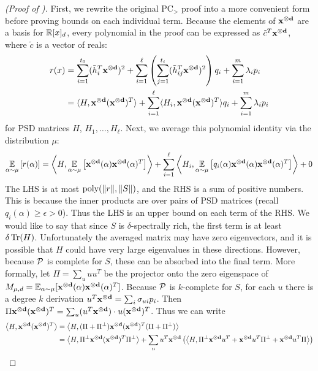 \begin{proof}[(Proof of )]
First, we rewrite the original PC$_>$ proof into a more convenient form before proving bounds on each individual term. Because the elements of $\mathbf{x^{\otimes d}}$ are a basis for $\mathbb R[x]_d$, every polynomial in the proof can be expressed as $\tilde{c}^T\mathbf{x^{\otimes d}}$, where $\tilde{c}$ is a vector of reals:
\begin{align*} r(x) &= \sum_{i=1}^{t_0} (\tilde{h}_i^T\mathbf{x^{\otimes d}})^2 + \sum_{i=1}^\ell \left(\sum_{j=1}^{t_i} (\tilde{h}_{ij}^T\mathbf{x^{\otimes d}})^2\right)q_i + \sum_{i=1}^m \lambda_i p_i \\
&= \langle H, \mathbf{x^{\otimes d}}(\mathbf{x^{\otimes d}})^T\rangle + \sum_{i=1}^\ell \langle H_i, \mathbf{x^{\otimes d}}(\mathbf{x^{\otimes d}})^T\rangle q_i + \sum_{i=1}^m \lambda_i p_i
\end{align*}
for PSD matrices $H$, $H_1,\dots,H_\ell$. Next, we average this polynomial identity via the distribution $\mu$:
\begin{align*}
\operatorname*{\mathbb{E}}_{\alpha \sim \mu}\left[r(\alpha)\right] &= \left\langle H, \operatorname*{\mathbb{E}}_{\alpha \sim \mu}\left[\mathbf{x^{\otimes d}}(\alpha)\mathbf{x^{\otimes d}}(\alpha)^T\right]\right\rangle + \sum_{i=1}^\ell \left\langle H_i, \operatorname*{\mathbb{E}}_{\alpha \sim \mu}\left[q_i(\alpha)\mathbf{x^{\otimes d}}(\alpha)\mathbf{x^{\otimes d}}(\alpha)^T\right]\right\rangle + 0 \\
\end{align*}
The LHS is at most $\operatorname{poly}(\|r\|, \|S\|)$, and the RHS is a sum of positive numbers. This is because the inner products are over pairs of PSD matrices (recall $q_i(\alpha) \geq \epsilon > 0$). Thus the LHS is an upper bound on each term of the RHS. 
%
We would like to say that since $S$ is $\delta$-spectrally rich, the first term is at least $\delta \operatorname{Tr}(H)$. 
%
Unfortunately the averaged matrix may have zero eigenvectors, and it is possible that $H$ could have very large eigenvalues in these directions. 
%
However, because $\mathcal P$ is complete for $S$, these can be absorbed into the final term. More formally, let $\Pi = \sum_u uu^T$ be the projector onto the zero eigenspace of $M_{\mu,d} = \operatorname*{\mathbb{E}}_{\alpha \sim \mu}[\mathbf{x^{\otimes d}}(\alpha)\mathbf{x^{\otimes d}}(\alpha)^T]$. Because $\mathcal P$ is $k$-complete for $S$, for each $u$ there is a degree $k$ derivation $u^T\mathbf{x^{\otimes d}} = \sum_i \sigma_{ui} p_i$. Then $\Pi \mathbf{x^{\otimes d}}(\mathbf{x^{\otimes d}})^T = \sum_u (u^T\mathbf{x^{\otimes d}}) \cdot u(\mathbf{x^{\otimes d}})^T$. Thus we can write
\begin{align*}
\Iprod{H, \mbasis{d}(\mbasis{d})^T} &= \Iprod{H, (\Pi + \Pi^\perp)\mbasis{d}(\mbasis{d})^T(\Pi + \Pi^\perp)} \\
&= \Iprod{H, \Pi^\perp \mbasis{d}(\mbasis{d})^T \Pi^\perp} + \sum_u u^T\mbasis{d}\left(\Iprod{H, \Pi^\perp \mbasis{d} u^T + \mbasis{d} u^T\Pi^\perp + \mbasis{d} u^T\Pi}\right) \\

\end{align*}
\end{proof}
